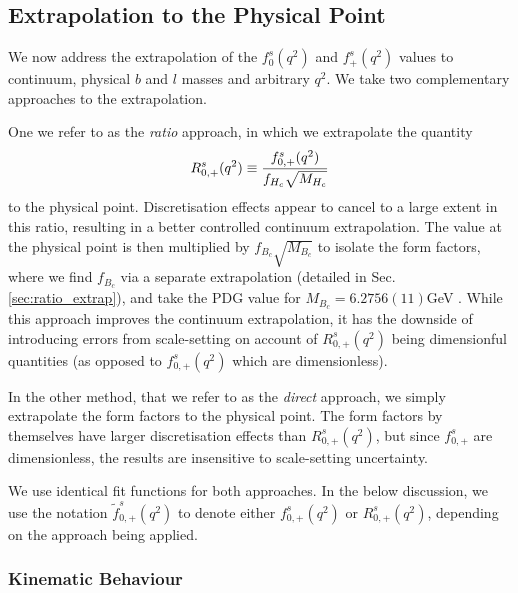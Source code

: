 \subsection{Extrapolation to the Physical Point}
\label{sec:extrapolation}

We now address the extrapolation of the $f_{0}^s(q^2)$ and $f_{+}^s(q^2)$ values to continuum, physical $b$ and $l$ masses and arbitrary $q^2$. We take two complementary approaches to the extrapolation.

One we refer to as the {\textit{ratio}} approach, in which we extrapolate the quantity
\begin{align}
  R^s_{0,+}(q^2) \equiv {f^s_{0,+}(q^2)\over f_{H_c}\sqrt{M_{H_c}}}
  \label{eq:ratio}
\end{align}
to the physical point. Discretisation effects appear to cancel to a large extent in this ratio, resulting in a better controlled continuum extrapolation. The value at the physical point is then multiplied by $f_{B_c}\sqrt{M_{B_c}}$ to isolate the form factors, where we find $f_{B_c}$ via a separate extrapolation (detailed in Sec. \ref{sec:ratio_extrap}), and take the PDG value for $M_{B_c} = 6.2756(11)$GeV \cite{PhysRevD.98.030001}. While this approach improves the continuum extrapolation, it has the downside of introducing errors from scale-setting on account of $R_{0,+}^s(q^2)$ being dimensionful quantities (as opposed to $f^s_{0,+}(q^2)$ which are dimensionless).

In the other method, that we refer to as the {\textit{direct}} approach, we simply extrapolate the form factors to the physical point. The form factors by themselves have larger discretisation effects than $R_{0,+}^s(q^2)$, but since $f^s_{0,+}$ are dimensionless, the results are insensitive to scale-setting uncertainty.

We use identical fit functions for both approaches. In the below discussion, we use the notation $\tilde{f}^s_{0,+}(q^2)$ to denote either $f^s_{0,+}(q^2)$ or $R_{0,+}^s(q^2)$, depending on the approach being applied.

\subsubsection{Kinematic Behaviour}

